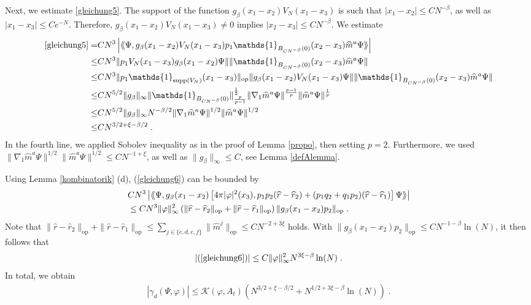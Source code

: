 \documentclass[11pt, english, american]{article}
\newcommand{\laa}{\langle\hspace{-0.08cm}\langle}
\newcommand{\raa}{\rangle\hspace{-0.08cm}\rangle}
\renewcommand{\phi}{\varphi}
\begin{document}
Next, we estimate \eqref{gleichung5}.
The support of the function $g_{\beta}(x_{1}-x_{2})V_N(x_1-x_3)$ is such that
$|x_1-x_2| \leq C N^ {-\beta}$, as well as $|x_1-x_3| \leq C e^ {-N}$. Therefore,
$g_{\beta}(x_{1}-x_{2})V_N(x_1-x_3) \neq 0$ implies $ |x_2-x_3| \leq C N^ {- \beta} $. We estimate
\begin{align*}
\eqref{gleichung5} =&C N^3\left|\laa\Psi ,g_{\beta}(x_{1}-x_{2})V_N(x_1-x_3)p_{1}
\mathds{1}_{ B_{C N^{- \beta}}(0)}  (x_2-x_3)
\widehat{m}^a \Psi\raa\right|
\\
\leq &C N^3 \| p_{1} V_N(x_1-x_3) g_{\beta}(x_{1}-x_{2}) \Psi \| 
\|\mathds{1}_{ B_{C N^{- \beta}}(0)}  (x_2-x_3)
\widehat{m}^a \Psi \|
\\
\leq &C N^3
\|p_1 \mathds{1}_{\text{supp}(V_N)} (x_1-x_3)\|_{\text{op}}
 \|g_{\beta}(x_{1}-x_{2}) V_N(x_1-x_3)  \Psi \| 
\| \mathds{1}_{ B_{C N^{- \beta}}(0)}  (x_2-x_3)
\widehat{m}^a \Psi \|
\\
\leq & C N^{5/2} \| g_{\beta}\|_\infty
 \|\mathds{1}_{ B_{C N^{- \beta}}(0)}  \|^{\frac{1}{2}}_{\frac{p}{p-1}} 
\| \nabla_1 \widehat{m}^a \Psi \|^{  \frac{p-1}{ p}} \| \widehat{m}^a \Psi \|^{\frac{1}{p}}
\\
\leq &
 C N^{5/2} \| g_{\beta}\|_\infty N^{- \beta/2} \| \nabla_1 \widehat{m}^a \Psi \|^{1/2} \| \widehat{m}^a \Psi \|^{1/2}
 \\
\leq &
 C N^{3/2+\xi- \beta/2}
 \;.
\end{align*}
In the fourth line, we applied Sobolev inequality as in the proof of Lemma \ref{propo}, then setting $p=2$.
Furthermore, we used
$ \| \nabla_1 \widehat{m}^a \Psi \|^{1/2} \| \widehat{m}^a \Psi \|^{1/2} \leq C N^{-1 + \xi}$,
as well as $ \| g_{\beta}\|_\infty \leq C$, see Lemma \ref{defAlemma}.




Using Lemma \ref{kombinatorik} (d),
 (\ref{gleichung6}) can be bounded by
\begin{align*}
&C N^3\left|\laa\Psi ,g_{\beta}(x_{1}-x_{2})
\left[4 \pi|\phi|^2(x_3),
p_1p_2(\widehat{r}-\widehat{r}_2)+(p_1q_2+q_1p_2)(\widehat{r}-\widehat{r}_1)\right] \Psi\raa\right|
%
\\&\leq CN^3\|\phi\|_\infty^2 \left(\|\widehat{r}-\widehat{r}_2\|_{\text{op}}+\|\widehat{r}-\widehat{r}_1\|_{\text{op}}\right)
\|g_{\beta}(x_{1}-x_{2})p_2\|_{\text{op}}
\;.
\end{align*}
Note that $\|\widehat{r}-\widehat{r}_2\|_{\text{op}}+\|\widehat{r}-\widehat{r}_1\|_{\text{op}}\leq\sum_{j\in\{c,d,e,f\}}\|\widehat{m}^j\|_{\text{op}}
\leq C N^{-2+ 3 \xi}$ holds. 
With $\|g_{\beta}(x_{1}-x_{2})p_2\|_{\text{op}}\leq C N^{-1-\beta} \ln(N) $, it then follows that
$$|(\ref{gleichung6})|\leq C
\| \phi \|_\infty^2
N^{3\xi-\beta} \ln(N)\;.$$
In total, we obtain
\begin{align*}
|\gamma_d (\Psi,\phi)| \leq 
\mathcal{K}(\phi,A_t)
\left(
	N^{3/2+\xi-\beta/2}+N^{1/2+3\xi-\beta}\ln(N)
\right) \;.
\end{align*}
\end{document}
